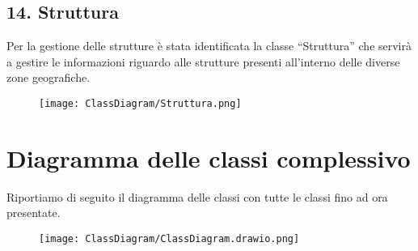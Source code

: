     \subsection*{14. Struttura}
        Per la gestione delle strutture è stata identificata la classe ``Struttura'' che servirà a gestire le informazioni riguardo alle strutture presenti all'interno delle diverse zone geografiche.
        \begin{figure}[H]
            \texttt{[image: ClassDiagram/Struttura.png]}
        \end{figure}

\newpage
\section{Diagramma delle classi complessivo}
    Riportiamo di seguito il diagramma delle classi con tutte le classi fino ad ora presentate.
    \begin{figure}[H]
        \centering
        \texttt{[image: ClassDiagram/ClassDiagram.drawio.png]}
    \end{figure}
